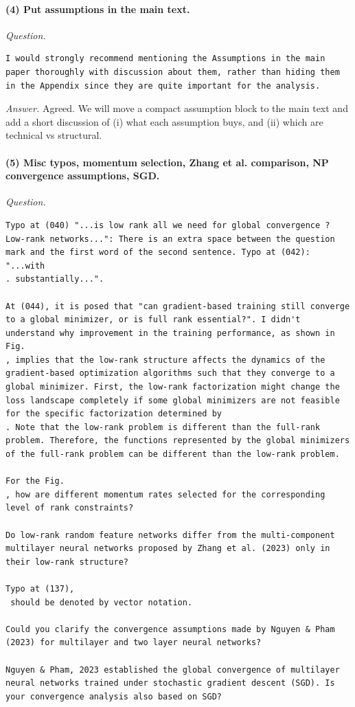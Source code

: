 \documentclass[11pt,a4paper]{article}
\begin{document}
\paragraph{(4) Put assumptions in the main text.}
\textit{Question.}\par
\begin{verbatim}
I would strongly recommend mentioning the Assumptions in the main paper thoroughly with discussion about them, rather than hiding them in the Appendix since they are quite important for the analysis.
\end{verbatim}
\textit{Answer.} Agreed. We will move a compact assumption block to the main text and add a short discussion of (i) what each assumption buys, and (ii) which are technical vs structural.

\paragraph{(5) Misc typos, momentum selection, Zhang et al. comparison, NP convergence assumptions, SGD.}
\textit{Question.}\par
\begin{verbatim}
Typo at (040) "...is low rank all we need for global convergence ? Low-rank networks...": There is an extra space between the question mark and the first word of the second sentence. Typo at (042): "...with 
. substantially...".

At (044), it is posed that "can gradient-based training still converge to a global minimizer, or is full rank essential?". I didn't understand why improvement in the training performance, as shown in Fig. 
, implies that the low-rank structure affects the dynamics of the gradient-based optimization algorithms such that they converge to a global minimizer. First, the low-rank factorization might change the loss landscape completely if some global minimizers are not feasible for the specific factorization determined by 
. Note that the low-rank problem is different than the full-rank problem. Therefore, the functions represented by the global minimizers of the full-rank problem can be different than the low-rank problem.

For the Fig. 
, how are different momentum rates selected for the corresponding level of rank constraints?

Do low-rank random feature networks differ from the multi-component multilayer neural networks proposed by Zhang et al. (2023) only in their low-rank structure?

Typo at (137), 
 should be denoted by vector notation.

Could you clarify the convergence assumptions made by Nguyen & Pham (2023) for multilayer and two layer neural networks?

Nguyen & Pham, 2023 established the global convergence of multilayer neural networks trained under stochastic gradient descent (SGD). Is your convergence analysis also based on SGD?
\end{verbatim}
\end{document}
